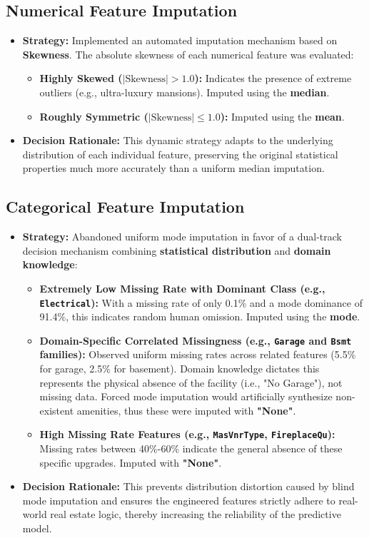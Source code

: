 \documentclass[11pt]{article}
\begin{document}
\subsection{Numerical Feature Imputation}
\begin{itemize}[leftmargin=*]
    \item \textbf{Strategy:} Implemented an automated imputation mechanism based on \textbf{Skewness}. The absolute skewness of each numerical feature was evaluated:
    \begin{itemize}
        \item \textbf{Highly Skewed ($|\text{Skewness}| > 1.0$):} Indicates the presence of extreme outliers (e.g., ultra-luxury mansions). Imputed using the \textbf{median}.
        \item \textbf{Roughly Symmetric ($|\text{Skewness}| \leq 1.0$):} Imputed using the \textbf{mean}.
    \end{itemize}
    \item \textbf{Decision Rationale:} This dynamic strategy adapts to the underlying distribution of each individual feature, preserving the original statistical properties much more accurately than a uniform median imputation.
\end{itemize}

\subsection{Categorical Feature Imputation}
\begin{itemize}[leftmargin=*]
    \item \textbf{Strategy:} Abandoned uniform mode imputation in favor of a dual-track decision mechanism combining \textbf{statistical distribution} and \textbf{domain knowledge}:
    \begin{itemize}
        \item \textbf{Extremely Low Missing Rate with Dominant Class (e.g., \texttt{Electrical}):} With a missing rate of only 0.1\% and a mode dominance of 91.4\%, this indicates random human omission. Imputed using the \textbf{mode}.
        \item \textbf{Domain-Specific Correlated Missingness (e.g., \texttt{Garage} and \texttt{Bsmt} families):} Observed uniform missing rates across related features (5.5\% for garage, 2.5\% for basement). Domain knowledge dictates this represents the physical absence of the facility (i.e., "No Garage"), not missing data. Forced mode imputation would artificially synthesize non-existent amenities, thus these were imputed with \textbf{"None"}.
        \item \textbf{High Missing Rate Features (e.g., \texttt{MasVnrType}, \texttt{FireplaceQu}):} Missing rates between 40\%-60\% indicate the general absence of these specific upgrades. Imputed with \textbf{"None"}.
    \end{itemize}
    \item \textbf{Decision Rationale:} This prevents distribution distortion caused by blind mode imputation and ensures the engineered features strictly adhere to real-world real estate logic, thereby increasing the reliability of the predictive model.
\end{itemize}
\end{document}
